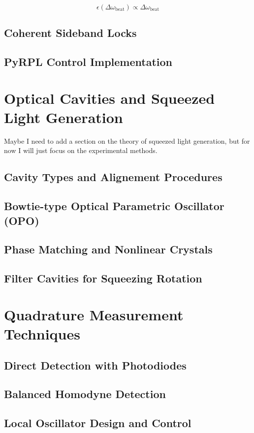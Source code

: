 \begin{equation}
\epsilon(\Delta \omega_{\mathrm{beat}}) \propto \Delta \omega_{\mathrm{beat}}
\end{equation}
\subsection{Coherent Sideband Locks}
\subsection{PyRPL Control Implementation}

\section{Optical Cavities and Squeezed Light Generation}
Maybe I need to add a section on the theory of squeezed light generation, but for now I will just focus on the experimental methods.
\subsection{Cavity Types and Alignement Procedures}


\subsection{Bowtie-type Optical Parametric Oscillator (OPO)}
\subsection{Phase Matching and Nonlinear Crystals}
\subsection{Filter Cavities for Squeezing Rotation}

\section{Quadrature Measurement Techniques}
\subsection{Direct Detection with Photodiodes}
\subsection{Balanced Homodyne Detection}
\subsection{Local Oscillator Design and Control}
